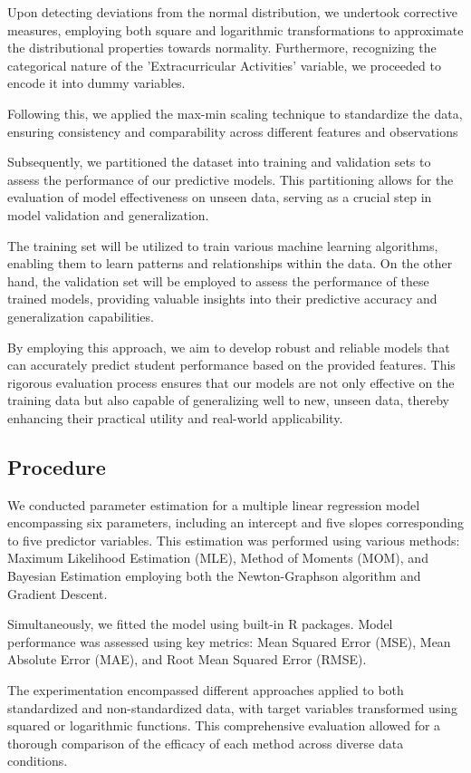 \documentclass[12pt]{article}
\begin{document}
	Upon detecting deviations from the normal distribution, we undertook corrective measures, employing both square and logarithmic transformations to approximate the distributional properties towards normality. Furthermore, recognizing the categorical nature of the 'Extracurricular Activities' variable, we proceeded to encode it into dummy variables.
	
	Following this, we applied the max-min scaling technique to standardize the data, ensuring consistency and comparability across different features and observations
	
	Subsequently, we partitioned the dataset into training and validation sets to assess the performance of our predictive models. This partitioning allows for the evaluation of model effectiveness on unseen data, serving as a crucial step in model validation and generalization.
	
	The training set will be utilized to train various machine learning algorithms, enabling them to learn patterns and relationships within the data. On the other hand, the validation set will be employed to assess the performance of these trained models, providing valuable insights into their predictive accuracy and generalization capabilities.
	
	By employing this approach, we aim to develop robust and reliable models that can accurately predict student performance based on the provided features. This rigorous evaluation process ensures that our models are not only effective on the training data but also capable of generalizing well to new, unseen data, thereby enhancing their practical utility and real-world applicability.
	
	
	\subsection{Procedure}
	We conducted parameter estimation for a multiple linear regression model encompassing six parameters, including an intercept and five slopes corresponding to five predictor variables. This estimation was performed using various methods: Maximum Likelihood Estimation (MLE), Method of Moments (MOM), and Bayesian Estimation employing both the Newton-Graphson algorithm and Gradient Descent.
	
	Simultaneously, we fitted the model using built-in R packages. Model performance was assessed using key metrics: Mean Squared Error (MSE), Mean Absolute Error (MAE), and Root Mean Squared Error (RMSE).
	
	The experimentation encompassed different approaches applied to both standardized and non-standardized data, with target variables transformed using squared or logarithmic functions. This comprehensive evaluation allowed for a thorough comparison of the efficacy of each method across diverse data conditions.
	
\end{document}
